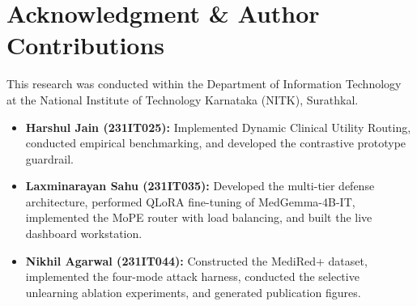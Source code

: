 \documentclass[lettersize,journal]{IEEEtran}
\begin{document}
\section*{Acknowledgment \& Author Contributions}
This research was conducted within the Department of Information Technology at the National Institute of Technology Karnataka (NITK), Surathkal. 
\begin{itemize}
    \item \textbf{Harshul Jain (231IT025):} Implemented Dynamic Clinical Utility Routing, conducted empirical benchmarking, and developed the contrastive prototype guardrail.
    \item \textbf{Laxminarayan Sahu (231IT035):} Developed the multi-tier defense architecture, performed QLoRA fine-tuning of MedGemma-4B-IT, implemented the MoPE router with load balancing, and built the live dashboard workstation.
    \item \textbf{Nikhil Agarwal (231IT044):} Constructed the MediRed+ dataset, implemented the four-mode attack harness, conducted the selective unlearning ablation experiments, and generated publication figures.
\end{itemize}
\end{document}
